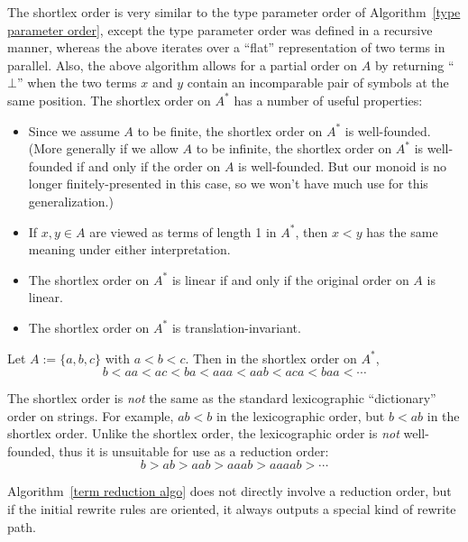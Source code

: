 \documentclass[../generics]{subfiles}
\begin{document}
The shortlex order is very similar to the type parameter order of Algorithm~\ref{type parameter order}, except the type parameter order was defined in a recursive manner, whereas the above iterates over a ``flat'' representation of two terms in parallel. Also, the above algorithm allows for a partial order on $A$ by returning ``$\bot$'' when the two terms $x$ and $y$ contain an incomparable pair of symbols at the same position. The shortlex order on $A^*$ has a number of useful properties:
\begin{itemize}
\item Since we assume $A$ to be finite, the shortlex order on $A^*$ is well-founded. (More generally if we allow $A$ to be infinite, the shortlex order on $A^*$ is well-founded if and only if the order on $A$ is well-founded. But our monoid is no longer finitely-presented in this case, so we won't have much use for this generalization.)
\item If $x,y\in A$ are viewed as terms of length 1 in $A^*$, then $x<y$ has the same meaning under either interpretation.
\item The shortlex order on $A^*$ is linear if and only if the original order on $A$ is linear.
\item The shortlex order on $A^*$ is translation-invariant.
\end{itemize}
\begin{example} Let $A:=\{a,b,c\}$ with $a<b<c$. Then in the shortlex order on $A^*$,
\[b<aa<ac<ba<aaa<aab<aca<baa<\cdots\]
\end{example}
The shortlex order is \emph{not} the same as the standard lexicographic ``dictionary'' order on strings. For example, $ab<b$ in the lexicographic order, but $b<ab$ in the shortlex order. Unlike the shortlex order, the lexicographic order is \emph{not} well-founded, thus it is unsuitable for use as a reduction order:
\[b>ab>aab>aaab>aaaab>\cdots\]

Algorithm~\ref{term reduction algo} does not directly involve a reduction order, but if the initial rewrite rules are oriented, it always outputs a special kind of rewrite path.
\end{document}
